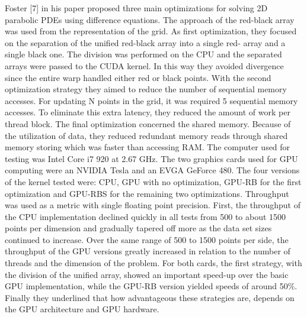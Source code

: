 Foster [7] in his paper proposed three main optimizations for solving 2D parabolic PDEs using difference equations. The approach of the red-black array was used from the representation of the grid. As first optimization, they focused on the separation of the unified red-black array into a single red- array and a single black one. The division was performed on the CPU and the separated arrays were passed to the CUDA kernel. In this way they avoided divergence since the entire warp handled either red or black points. With the second optimization strategy they aimed to reduce the number of sequential memory accesses. For updating N points in the grid, it was required 5 sequential memory accesses. To eliminate this extra latency, they reduced the amount of work per thread block. The final optimization concerned the shared memory. Because of the utilization of data, they reduced redundant memory reads through shared memory storing which was faster than accessing RAM. The computer used for testing was Intel Core i7 920 at 2.67 GHz. The two graphics cards used for GPU computing were an NVIDIA Tesla and an EVGA GeForce 480. The four versions of the kernel tested were: CPU, GPU with no optimization, GPU-RB for the first optimization and GPU-RBS for the remaining two optimizations. Throughput was used as a metric with single floating point precision. First, the throughput of the CPU implementation declined quickly in all tests from 500 to about 1500 points per dimension and gradually tapered off more as the data set sizes continued to increase. Over the same range of 500 to 1500 points per side, the throughput of the GPU versions greatly increased in relation to the number of threads and the dimension of the problem. For both cards, the first strategy, with the division of the unified array, showed an important speed-up over the basic GPU implementation, while the GPU-RB version yielded speeds of around 50\%. Finally they underlined that how advantageous these strategies are, depends on the GPU architecture and GPU hardware.


